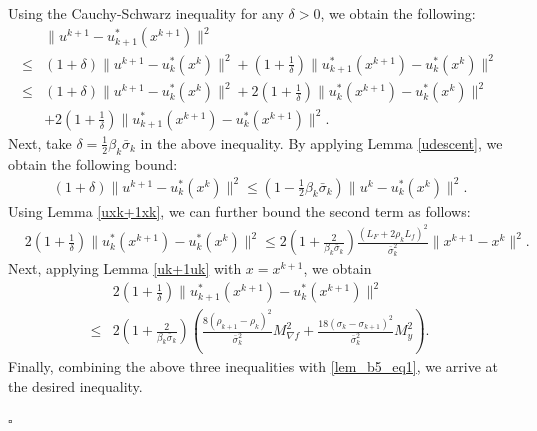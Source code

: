 \documentclass{article}
\newenvironment{proof}[1][Proof]{\par
	\normalfont\topsep6pt\relax
	\trivlist\item[\hskip\labelsep\itshape #1.]\ignorespaces
}{%
	\hfill\ensuremath{\square}\endtrivlist
}
\def\x{x}
\def\u{u}
\begin{document}
	 \begin{proof}
	 	Using the Cauchy-Schwarz inequality for any $\delta>0$, we obtain the following:
	 	\begin{equation}\label{lem_b5_eq1}
        \begin{aligned}
	 		&\|\u^{k+1}-\u_{k+1}^*(\x^{k+1})\|^2\\\le& (1+\delta)\|\u^{k+1}-\u_{k}^*(x^{k})\|^2+(1+\frac{1}{\delta})\|\u_{k+1}^*(\x^{k+1})-\u_{k}^*(x^{k})\|^2\\
	 		\le&(1+\delta)\|\u^{k+1}-\u_{k}^*(x^{k})\|^2+2(1+\frac{1}{\delta})\|\u_{k}^*(x^{k+1})-\u_{k}^*(x^{k})\|^2\\
            &+2(1+\frac{1}{\delta})\|\u_{k+1}^*(x^{k+1})-\u_{k}^*(x^{k+1})\|^2.
            \end{aligned}
	 	\end{equation}
	 	Next, take $\delta=\frac{1}{2}\beta_k \bar{\sigma}_k$ in the above inequality. By applying Lemma \ref{udescent}, we obtain the following bound:
	 	\begin{align*}
	 		(1+\delta)\|\u^{k+1}-\u_{k}^*(\x^{k})\|^2\le(1-\frac{1}{2}\beta_k\bar{\sigma}_k)\|\u^{k}-\u_{k}^*(\x^{k})\|^2.
	 	\end{align*}
Using Lemma \ref{uxk+1xk}, we can further bound the second term as follows:
    \begin{align*}
	 		&2(1+\frac{1}{\delta})\|u_{k}^*(x^{k+1})-u_{k}^*(x^{k})\|^2\le 2(1+\frac{2}{\beta_k\bar{\sigma}_k})\frac{(L_{F}+2\rho_kL_{f})^2}{\bar{\sigma}_k^2}\|x^{k+1}-x^k\|^2.
	 	\end{align*}
    Next, applying Lemma \ref{uk+1uk} with $\x=\x^{k+1}$, we obtain
    \[
\begin{aligned}
    &2(1+\frac{1}{\delta})\|\u_{k+1}^*(\x^{k+1})-\u_{k}^*(\x^{k+1})\|^2 \\
    \le& 2(1+\frac{2}{\beta_k\bar{\sigma}_k}) \left( \frac{8(\rho_{k+1} - \rho_k)^2}{\bar{\sigma}_k^2}M_{\nabla f}^2 + \frac{18(\sigma_{k} - \sigma_{k+1})^2}{\bar{\sigma}_k^2}M_y^2 \right).
\end{aligned}
    \]        
Finally, combining the above three inequalities with \eqref{lem_b5_eq1}, we arrive at the desired inequality.
	
	 \end{proof}

      
	 
\end{document}
